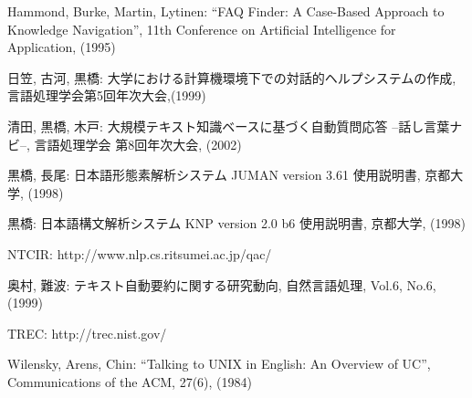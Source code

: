  
 \begin{thebibliography}{99} 
	  Hammond, Burke, Martin, Lytinen:
	  ``FAQ Finder: A Case-Based Approach to Knowledge Navigation'', 
	  11th Conference on Artificial Intelligence for Application, (1995)

          日笠, 古河, 黒橋:
          大学における計算機環境下での対話的ヘルプシステムの作成,
          言語処理学会第5回年次大会,(1999)

          清田, 黒橋, 木戸:
	  大規模テキスト知識ベースに基づく自動質問応答
	  --話し言葉ナビ--, 言語処理学会 第8回年次大会, (2002)

          黒橋, 長尾:
	  日本語形態素解析システム JUMAN version 3.61 使用説明書,
	  京都大学, (1998)

          黒橋:
	  日本語構文解析システム KNP version 2.0 b6 使用説明書,
	  京都大学, (1998)

	  NTCIR: 
	  http://www.nlp.cs.ritsumei.ac.jp/qac/

          奥村, 難波:
	  テキスト自動要約に関する研究動向,
	  自然言語処理, Vol.6, No.6, (1999)

	  TREC: 
	  http://trec.nist.gov/

	  Wilensky, Arens, Chin: 
	  ``Talking to UNIX in English: An Overview of UC'', 
	  Communications of the ACM, 27(6), (1984)
 \end{thebibliography}



\begin{biography}


\end{biography}



